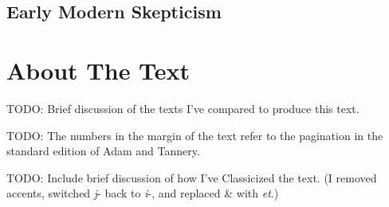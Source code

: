 \subsection*{Early Modern Skepticism}



\section*{About The Text}

TODO: Brief discussion of the texts I've compared to produce this text.

TODO: The numbers in the margin of the text refer to the pagination in the standard edition of Adam and Tannery.

TODO: Include brief discussion of how I've Classicized the text. (I removed accents, switched \textit{j}- back to \textit{i}-, and replaced \& with \textit{et}.)


